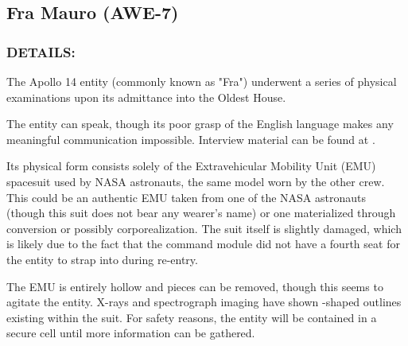 \subsection*{Fra Mauro (AWE-7)}
\subsubsection*{DETAILS:}
\par The Apollo 14 entity (commonly known as "Fra") underwent a
series of physical examinations upon its admittance into the
Oldest House.
\par The entity can speak, though its poor grasp of the English
language makes any meaningful communication impossible.
Interview material can be found at .
\par Its physical form consists solely of the Extravehicular Mobility Unit
(EMU) spacesuit used by NASA astronauts, the same model worn
by the other crew. This could be an authentic EMU taken from
one of the NASA astronauts (though this suit does not bear any
wearer's name) or one materialized through 
conversion or possibly 
corporealization. The suit itself
is slightly damaged, which is likely due to the fact that the
command module did not have a fourth seat for the entity to strap
into during re-entry.
\par The EMU is entirely hollow and pieces can be removed, though
this seems to agitate the entity. X-rays and spectrograph imaging
have shown -shaped outlines existing within the suit.
For safety reasons, the entity will be contained in a secure cell
until more information can be gathered.